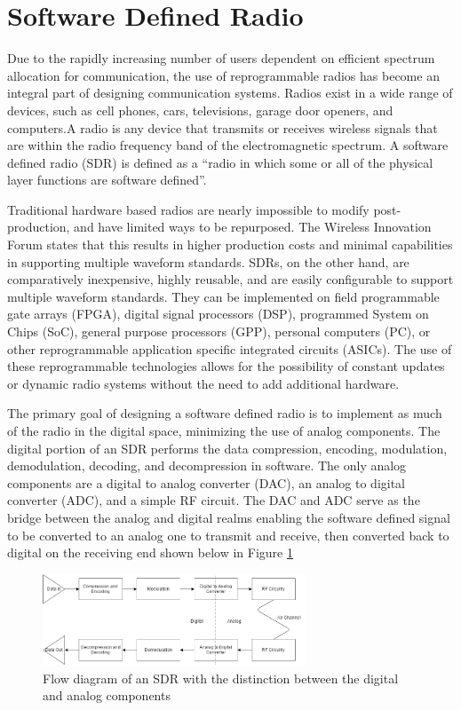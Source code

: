 \section{Software Defined Radio}
Due to the rapidly increasing number of users dependent on efficient spectrum allocation for communication, the use of reprogrammable radios has become an integral part of designing communication systems. Radios exist in a wide range of devices, such as cell phones, cars, televisions, garage door openers, and computers.A radio is any device that transmits or receives wireless signals that are within the radio frequency band of the electromagnetic spectrum. A software defined radio (SDR) is defined as a “radio in which some or all of the physical layer functions are software defined”.\cite{sdr_forum} \par
Traditional hardware based radios are nearly impossible to modify post-production, and have limited ways to be repurposed. The Wireless Innovation Forum states that this results in higher production costs and minimal capabilities in supporting multiple waveform standards.\cite{wireless_innovation} SDRs, on the other hand, are comparatively inexpensive, highly reusable, and are easily configurable to support multiple waveform standards. They can be implemented on field programmable gate arrays (FPGA), digital signal processors (DSP), programmed System on Chips (SoC), general purpose processors (GPP), personal computers (PC), or other reprogrammable application specific integrated circuits (ASICs). The use of these reprogrammable technologies allows for the possibility of constant updates or dynamic radio systems without the need to add additional hardware. \par
The primary goal of designing a software defined radio is to implement as much of the radio in the digital space, minimizing the use of analog components. The digital portion of an SDR performs the data compression, encoding, modulation, demodulation, decoding, and decompression in software. The only analog components are a digital to analog converter (DAC), an analog to digital converter (ADC), and a simple RF circuit. The DAC and ADC serve as the bridge between the analog and digital realms enabling the software defined signal to be converted to an analog one to transmit and receive, then converted back to digital on the receiving end shown below in Figure \ref{fig:sdr_flow_diagram}
\begin{figure}[ht]
\centering
\includegraphics[width=0.70\textwidth]{img/sdr_diagram.png}
\caption{Flow diagram of an SDR with the distinction between the digital and analog components}
\label{fig:sdr_flow_diagram}
\end{figure}\par
